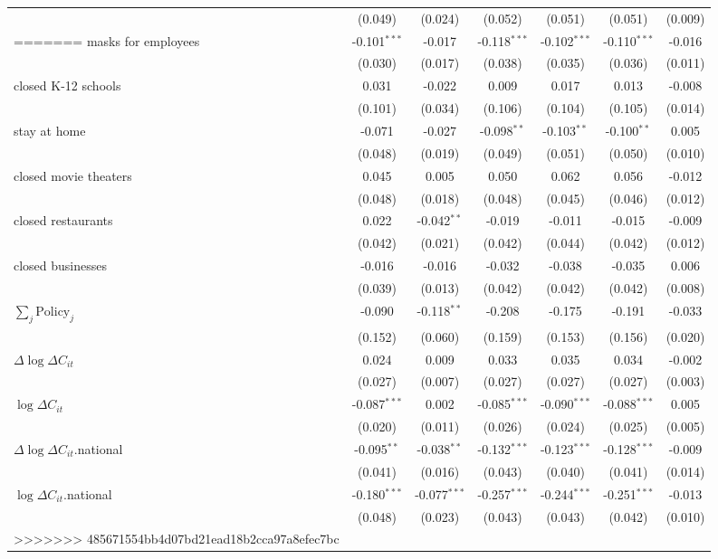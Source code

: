 \begin{tabular}{lccccc|>{}c}
 & (0.049) & (0.024) & (0.052) & (0.051) & (0.051) & (0.009)\\
=======
masks for employees & -0.101$^{***}$ & -0.017 & -0.118$^{***}$ & -0.102$^{***}$ & -0.110$^{***}$ & -0.016\\
 & (0.030) & (0.017) & (0.038) & (0.035) & (0.036) & (0.011)\\
closed K-12 schools & 0.031 & -0.022 & 0.009 & 0.017 & 0.013 & -0.008\\
 & (0.101) & (0.034) & (0.106) & (0.104) & (0.105) & (0.014)\\
stay at home & -0.071 & -0.027 & -0.098$^{**}$ & -0.103$^{**}$ & -0.100$^{**}$ & 0.005\\
 & (0.048) & (0.019) & (0.049) & (0.051) & (0.050) & (0.010)\\
closed movie theaters & 0.045 & 0.005 & 0.050 & 0.062 & 0.056 & -0.012\\
 & (0.048) & (0.018) & (0.048) & (0.045) & (0.046) & (0.012)\\
closed restaurants & 0.022 & -0.042$^{**}$ & -0.019 & -0.011 & -0.015 & -0.009\\
 & (0.042) & (0.021) & (0.042) & (0.044) & (0.042) & (0.012)\\
closed businesses & -0.016 & -0.016 & -0.032 & -0.038 & -0.035 & 0.006\\
 & (0.039) & (0.013) & (0.042) & (0.042) & (0.042) & (0.008)\\
$\sum_j \mathrm{Policy}_j$ & -0.090 & -0.118$^{**}$ & -0.208 & -0.175 & -0.191 & -0.033\\
 & (0.152) & (0.060) & (0.159) & (0.153) & (0.156) & (0.020)\\
$\Delta \log \Delta C_{it}$ & 0.024 & 0.009 & 0.033 & 0.035 & 0.034 & -0.002\\
 & (0.027) & (0.007) & (0.027) & (0.027) & (0.027) & (0.003)\\
$\log \Delta C_{it}$ & -0.087$^{***}$ & 0.002 & -0.085$^{***}$ & -0.090$^{***}$ & -0.088$^{***}$ & 0.005\\
 & (0.020) & (0.011) & (0.026) & (0.024) & (0.025) & (0.005)\\
$\Delta \log \Delta C_{it}$.national & -0.095$^{**}$ & -0.038$^{**}$ & -0.132$^{***}$ & -0.123$^{***}$ & -0.128$^{***}$ & -0.009\\
 & (0.041) & (0.016) & (0.043) & (0.040) & (0.041) & (0.014)\\
$\log \Delta C_{it}$.national & -0.180$^{***}$ & -0.077$^{***}$ & -0.257$^{***}$ & -0.244$^{***}$ & -0.251$^{***}$ & -0.013\\
 & (0.048) & (0.023) & (0.043) & (0.043) & (0.042) & (0.010)\\
>>>>>>> 485671554bb4d07bd21ead18b2cca97a8efec7bc
\bottomrule
\end{tabular}
